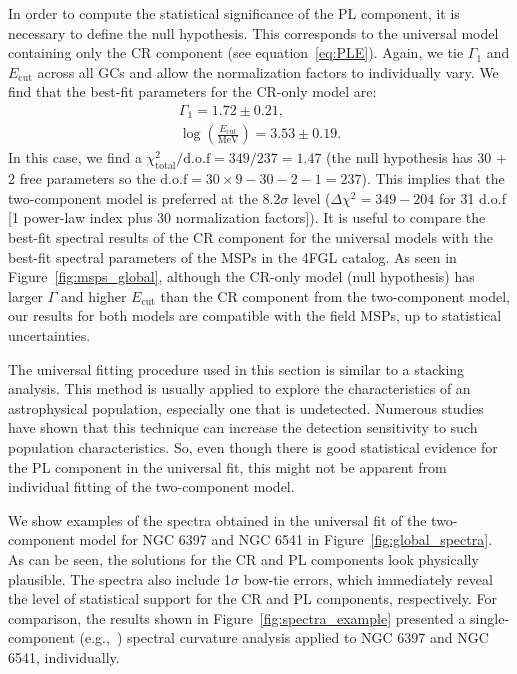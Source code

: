 \documentclass[doublespace,nopageskip]{VTthesis} %
\begin{document}
In order to compute the statistical significance of the {PL} component, it is necessary to define the null hypothesis. This corresponds to the universal model containing only the CR component (see equation~\ref{eq:PLE}). Again, we tie $\Gamma_1$ and $E_\mathrm{cut}$ across all GCs and allow the normalization factors to individually vary. We find that the best-fit parameters for the CR-only model are:
\begin{align}\nonumber
    \Gamma_1 = 1.72 \pm 0.21, \\\nonumber
    \log\left(\frac{E_\mathrm{cut}}{\mathrm{MeV}}\right) = 3.53 \pm 0.19.
\end{align}
In this case, we find a $\chi^2_\mathrm{total} / \mathrm{d.o.f} = 349/237=1.47$ (the null hypothesis has 30 + 2 free parameters so the $\mathrm{d.o.f}=30\times 9 - 30 - 2 - 1 = 237$). This implies that the two-component model is preferred at the 8.2$\sigma$ level ($\Delta \chi^2=349-204$ for 31 d.o.f [1 power-law index plus 30 normalization factors]). It is useful to compare the best-fit spectral results of the CR component for the universal models with the best-fit spectral parameters of the MSPs in the 4FGL catalog. As seen in Figure~\ref{fig:msps_global}, although the CR-only model (null hypothesis) has larger $\Gamma$ and higher $E_\mathrm{cut}$ than the CR component from the two-component model, our results for both models are compatible with the field MSPs, up to statistical uncertainties.

The universal fitting procedure used in this section is similar to a stacking analysis. This method is usually applied to explore the characteristics of an astrophysical population, especially one that is undetected. Numerous studies have shown that this technique can increase the detection sensitivity to such population characteristics. So, even though there is good statistical evidence for the {PL} component in the universal fit,  this might not be apparent from individual fitting of the two-component model.

We show examples of the spectra obtained in the universal fit of the two-component model for NGC 6397 and NGC 6541 in Figure~\ref{fig:global_spectra}. As can be seen, the solutions for the CR and {PL} components look physically plausible. The spectra also include 1$\sigma$ bow-tie errors, which immediately reveal the level of statistical support for the CR and {PL} components, respectively. For comparison, the results shown in Figure~\ref{fig:spectra_example} presented a {single-component (e.g.,~\citet{2020ApJS..247...33A})} spectral curvature analysis applied to NGC 6397 and NGC 6541, individually. 
\end{document}
